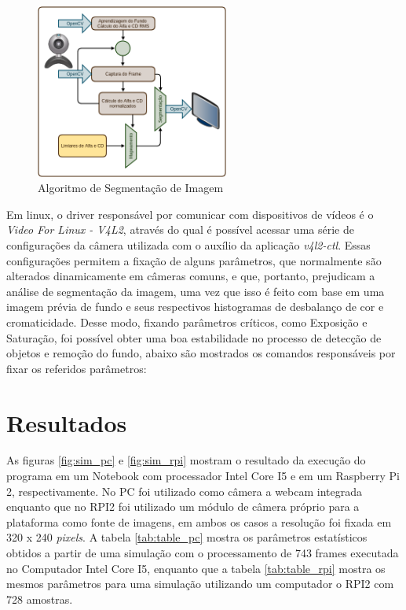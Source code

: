 \documentclass[conference]{IEEEtran}
\begin{document}


\begin{figure}[!t]
\centering
\includegraphics[width=2.5in]{Algoritmo}
\caption{Algoritmo de Segmentação de Imagem}
\label{fig:algoritmo}
\end{figure}

Em linux, o driver responsável por comunicar com dispositivos de vídeos é o \textit{Video For Linux - V4L2}, através do qual é possível acessar uma série de configurações da câmera utilizada com o auxílio da aplicação \textit{v4l2-ctl}. Essas configurações permitem a fixação de alguns parâmetros, que normalmente são alterados dinamicamente em câmeras comuns, e que, portanto, prejudicam a análise de segmentação da imagem, uma vez que isso é feito com base em uma imagem prévia de fundo e seus respectivos histogramas de desbalanço de cor e cromaticidade. Desse modo, fixando parâmetros críticos, como Exposição e Saturação, foi possível obter uma boa estabilidade no processo de detecção de objetos e remoção do fundo, abaixo são mostrados os comandos responsáveis por fixar os referidos parâmetros:



\section{Resultados}
As figuras \ref{fig:sim_pc} e \ref{fig:sim_rpi} mostram o resultado da execução do programa em um Notebook com processador Intel Core I5 e em um Raspberry Pi 2, respectivamente. No PC foi utilizado como câmera a webcam integrada enquanto que no RPI2 foi utilizado um módulo de câmera próprio para a plataforma como fonte de imagens, em ambos os casos a resolução foi fixada em 320 x 240 \textit{pixels}. A tabela \ref{tab:table_pc} mostra os parâmetros estatísticos obtidos a partir de uma simulação com o processamento de 743 frames executada no Computador Intel Core I5, enquanto que  a tabela \ref{tab:table_rpi} mostra os mesmos parâmetros para uma simulação utilizando um computador o RPI2 com 728 amostras.
\end{document}
